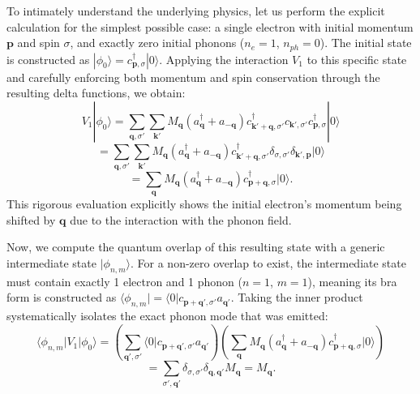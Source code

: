 \begin{example}
    To intimately understand the underlying physics, let us perform the explicit calculation for the simplest possible case: a single electron with initial momentum \(\mathbf{p}\) and spin \(\sigma\), and exactly zero initial phonons (\(n_e = 1\), \(n_{ph} = 0\)). The initial state is constructed as \(|\phi_0\rangle = c_{\mathbf{p},\sigma}^\dagger |0\rangle\). Applying the interaction \(V_1\) to this specific state and carefully enforcing both momentum and spin conservation through the resulting delta functions, we obtain:
    \[
        V_1 | \phi_0 \rangle = \sum_{\mathbf{q},\sigma'} \sum_{\mathbf{k}'} M_{\mathbf{q}} (a_{\mathbf{q}}^\dagger + a_{-\mathbf{q}}) c_{\mathbf{k}'+\mathbf{q},\sigma'}^\dagger c_{\mathbf{k}',\sigma'} c_{\mathbf{p},\sigma}^\dagger |0\rangle
    \]
    \[
        = \sum_{\mathbf{q},\sigma'} \sum_{\mathbf{k}'} M_{\mathbf{q}} (a_{\mathbf{q}}^\dagger + a_{-\mathbf{q}}) c_{\mathbf{k}'+\mathbf{q},\sigma'}^\dagger \delta_{\sigma,\sigma'} \delta_{\mathbf{k}',\mathbf{p}} |0\rangle
    \]
    \[
        = \sum_{\mathbf{q}} M_{\mathbf{q}} (a_{\mathbf{q}}^\dagger + a_{-\mathbf{q}}) c_{\mathbf{p}+\mathbf{q},\sigma}^\dagger |0\rangle.
    \]
    This rigorous evaluation explicitly shows the initial electron's momentum being shifted by \(\mathbf{q}\) due to the interaction with the phonon field.

    Now, we compute the quantum overlap of this resulting state with a generic intermediate state \(|\phi_{n,m}\rangle\). For a non-zero overlap to exist, the intermediate state must contain exactly 1 electron and 1 phonon (\(n = 1\), \(m = 1\)), meaning its bra form is constructed as \(\langle \phi_{n,m} | = \langle 0 | c_{\mathbf{p}+\mathbf{q}',\sigma'} a_{\mathbf{q}'}\). Taking the inner product systematically isolates the exact phonon mode that was emitted:
    \[
        \langle \phi_{n,m} | V_1 | \phi_0 \rangle = \left( \sum_{\mathbf{q}',\sigma'} \langle 0 | c_{\mathbf{p}+\mathbf{q}',\sigma'} a_{\mathbf{q}'} \right) \left( \sum_{\mathbf{q}} M_{\mathbf{q}} (a_{\mathbf{q}}^\dagger + a_{-\mathbf{q}}) c_{\mathbf{p}+\mathbf{q},\sigma}^\dagger |0\rangle \right)
    \]
    \[
        = \sum_{\sigma',\mathbf{q}'} \delta_{\sigma,\sigma'} \delta_{\mathbf{q},\mathbf{q}'} M_{\mathbf{q}} = M_{\mathbf{q}}.
    \]


\end{example}
